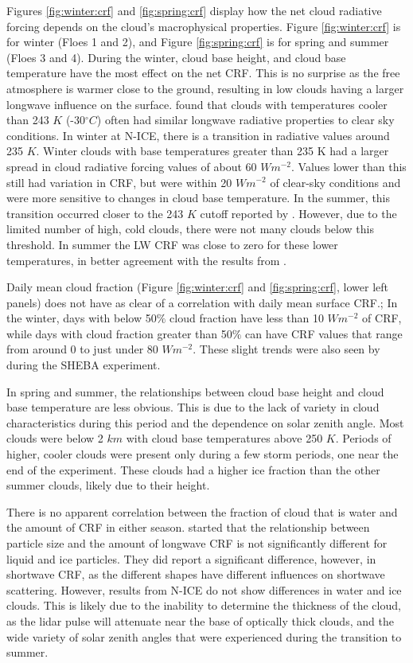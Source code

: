 Figures \ref{fig:winter:crf} and \ref{fig:spring:crf} display how the net cloud radiative forcing depends on the cloud's macrophysical properties. Figure \ref{fig:winter:crf} is for winter (Floes 1 and 2), and Figure \ref{fig:spring:crf} is for spring and summer (Floes 3 and 4). During the winter, cloud base height, and cloud base temperature have the most effect on the net CRF. This is no surprise as the free atmosphere is warmer close to the ground, resulting in low clouds having a larger longwave influence on the surface. \citet{shupe:2004} found that clouds with temperatures cooler than 243 $K$ (-30$^{\circ}C$) often had similar longwave radiative properties to clear sky conditions. In winter at N-ICE, there is a transition in radiative values around 235 $K$. Winter clouds with base temperatures greater than 235 K had a larger spread in cloud radiative forcing values of about 60 $Wm^{-2}$. Values lower than this still had variation in CRF, but were within 20 $Wm^{-2}$ of clear-sky conditions and were more sensitive to changes in cloud base temperature. In the summer, this transition occurred closer to the 243 $K$ cutoff reported by \citet{shupe:2004}. However, due to the limited number of high, cold clouds, there were not many clouds below this threshold. In summer the LW CRF was close to zero for these lower temperatures, in better agreement with the results from \citet{shupe:2004}. 

Daily mean cloud fraction (Figure \ref{fig:winter:crf} and \ref{fig:spring:crf}, lower left panels) does not have as clear of a correlation with daily mean surface CRF.; In the winter, days with below 50$\%$ cloud fraction have less than 10 $Wm^{-2}$ of CRF, while days with cloud fraction greater than 50$\%$ can have CRF values that range from around 0 to just under 80 $Wm^{-2}$. These slight trends were also seen by \citet{shupe:2004} during the SHEBA experiment. 

In spring and summer, the relationships between cloud base height and cloud base temperature are less obvious. This is due to the lack of variety in cloud characteristics during this period and the dependence on solar zenith angle. Most clouds were below 2 $km$ with cloud base temperatures above 250 $K$. Periods of higher, cooler clouds were present only during a few storm periods, one near the end of the experiment. These clouds had a higher ice fraction than the other summer clouds, likely due to their height. 

There is no apparent correlation between the fraction of cloud that is water and the amount of CRF in either season. \citet{schweiger:1999} started that the relationship between particle size and the amount of longwave CRF is not significantly different for liquid and ice particles. They did report a significant difference, however, in shortwave CRF, as the different shapes have different influences on shortwave scattering. However, results from N-ICE do not show differences in water and ice clouds. This is likely due to the inability to determine the thickness of the cloud, as the lidar pulse will attenuate near the base of optically thick clouds, and the wide variety of solar zenith angles that were experienced during the transition to summer. 

